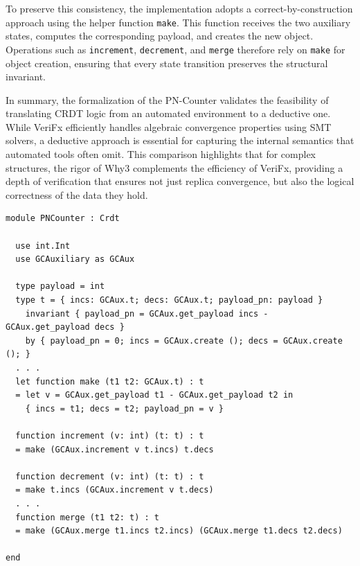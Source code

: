 To preserve this consistency, the implementation adopts a correct-by-construction approach using the helper function \texttt{make}. This function receives the two auxiliary states, computes the corresponding payload, and creates the new object. Operations such as \texttt{increment}, \texttt{decrement}, and \texttt{merge} therefore rely on \texttt{make} for object creation, ensuring that every state transition preserves the structural invariant.

In summary, the formalization of the PN-Counter validates the feasibility of translating CRDT logic from an automated environment to a deductive one. While VeriFx efficiently handles algebraic convergence properties using SMT solvers, a deductive approach is essential for capturing the internal semantics that automated tools often omit. This comparison highlights that for complex structures, the rigor of Why3 complements the efficiency of VeriFx, providing a depth of verification that ensures not just replica convergence, but also the logical correctness of the data they hold.

\begin{lstlisting}[caption={The implementation of Positive-Negative Counter in Why3}, label={list:pncounter_why3}]
module PNCounter : Crdt

  use int.Int
  use GCAuxiliary as GCAux

  type payload = int
  type t = { incs: GCAux.t; decs: GCAux.t; payload_pn: payload }
    invariant { payload_pn = GCAux.get_payload incs - GCAux.get_payload decs }
    by { payload_pn = 0; incs = GCAux.create (); decs = GCAux.create (); }
  . . .
  let function make (t1 t2: GCAux.t) : t
  = let v = GCAux.get_payload t1 - GCAux.get_payload t2 in
    { incs = t1; decs = t2; payload_pn = v }

  function increment (v: int) (t: t) : t
  = make (GCAux.increment v t.incs) t.decs

  function decrement (v: int) (t: t) : t
  = make t.incs (GCAux.increment v t.decs)
  . . .
  function merge (t1 t2: t) : t
  = make (GCAux.merge t1.incs t2.incs) (GCAux.merge t1.decs t2.decs)

end
\end{lstlisting}